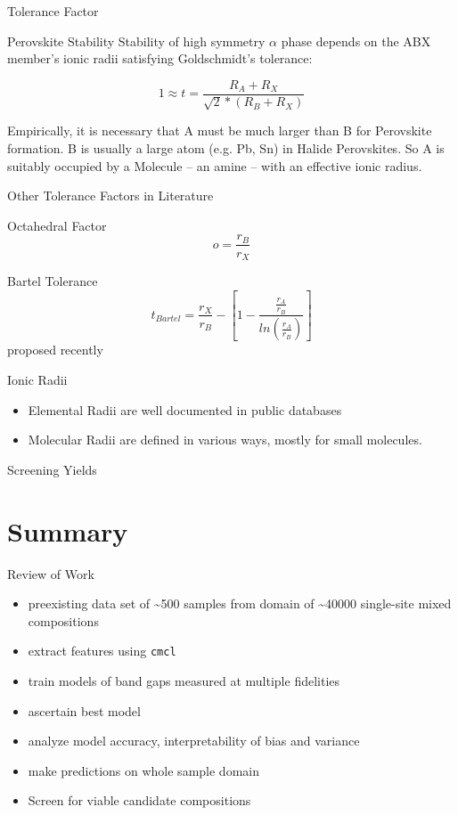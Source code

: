 \documentclass[10pt, aspectratio=169, presentation]{beamer}
\begin{document}
\begin{frame}[label={sec:orgb71d26e}]{Tolerance Factor}
\begin{block}{Perovskite Stability}
Stability of high symmetry \(\alpha\) phase depends on the ABX member's
ionic radii satisfying Goldschmidt's tolerance:
\autocite{yin-2015-halid-perov}

\[
1 \approx t = \frac{R_A+R_X}{\sqrt{2}*(R_B+R_X)}
\]

Empirically, it is \alert{necessary} that A must be much larger than B
for Perovskite formation. B is usually a large atom (e.g. Pb, Sn) in
Halide Perovskites. So A is suitably occupied by a Molecule -- an
amine -- with an effective ionic radius.
\autocite{kieslich-2015-exten-toler}
\end{block}
\end{frame}
\begin{frame}[label={sec:org638cbf4}]{Other Tolerance Factors in Literature}
\begin{block}{Octahedral Factor}
\[
o=\frac{r_B}{r_X}
\]
\end{block}
\begin{block}{Bartel Tolerance}
\[
t_{Bartel}=\frac{r_X}{r_B}-[1-\frac{\frac{r_A}{r_B}}{ln(\frac{r_A}{r_B})}]
\]
proposed recently
\autocite{bartel-2019-new-toler}
\end{block}
\begin{block}{Ionic Radii}
\begin{itemize}
\item Elemental Radii are well documented in public databases
\item Molecular Radii are defined in various ways, mostly for small
molecules.
\end{itemize}
\end{block}
\end{frame}

\begin{frame}[label={sec:org99453c5}]{Screening Yields}
\end{frame}
\section{Summary}
\label{sec:org17925d3}
\begin{frame}[label={sec:orgb42e787},fragile]{Review of Work}
 \begin{itemize}
\item preexisting data set of \textasciitilde{}500 samples from domain of \textasciitilde{}40000 single-site mixed compositions
\item extract features using \texttt{cmcl}
\item train models of band gaps measured at multiple fidelities
\item ascertain best model
\item analyze model accuracy, interpretability of bias and variance
\item make predictions on whole sample domain
\item Screen for viable candidate compositions
\end{itemize}
\end{frame}
\end{document}
